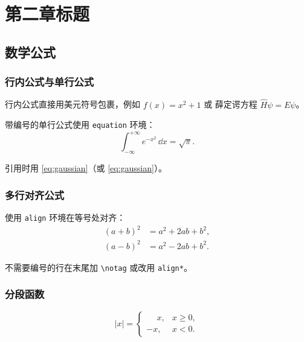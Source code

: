 \chapter{第二章标题}

\section{数学公式}

\subsection{行内公式与单行公式}

行内公式直接用美元符号包裹，例如 $f(x) = x^2 + 1$ 或
薛定谔方程 $\hat{H}\psi = E\psi$。

带编号的单行公式使用 \texttt{equation} 环境：
\begin{equation}
  \int_{-\infty}^{+\infty} e^{-x^2}\,\dd x = \sqrt{\pi}.
  \label{eq:gaussian}
\end{equation}

引用时用 \cref{eq:gaussian}（或 \eqref{eq:gaussian}）。

\subsection{多行对齐公式}

使用 \texttt{align} 环境在等号处对齐：
\begin{align}
  (a+b)^2 &= a^2 + 2ab + b^2, \label{eq:binom2} \\
  (a-b)^2 &= a^2 - 2ab + b^2. \label{eq:binom2m}
\end{align}

不需要编号的行在末尾加 \verb|\notag| 或改用 \texttt{align*}。

\subsection{分段函数}

\begin{equation}
  |x| =
  \begin{cases}
    \phantom{-}x, & x \geq 0, \\
    -x,           & x < 0.
  \end{cases}
\end{equation}

